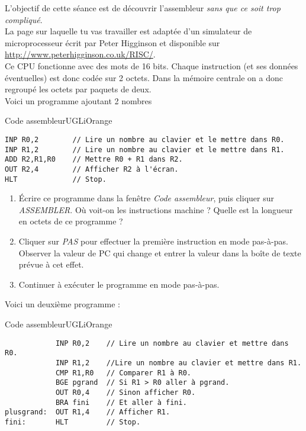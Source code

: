 \documentclass[a4paper,10pt,french]{article}
\begin{document}

L'objectif de cette séance est de découvrir l'assembleur \textit{sans que ce soit trop compliqué}.\\

La page sur laquelle tu vas travailler est adaptée d'un simulateur de microprocesseur écrit par Peter Higginson et disponible sur \url{http://www.peterhigginson.co.uk/RISC/}.\\
Ce CPU fonctionne avec des mots de 16 bits. Chaque instruction (et ses données éventuelles) est donc codée sur 2 octets. Dans la mémoire centrale on a donc regroupé les octets par paquets de deux.\\

Voici un programme ajoutant 2 nombres
\begin{encadrecolore}{Code assembleur}{UGLiOrange}
\begin{verbatim}
INP R0,2        // Lire un nombre au clavier et le mettre dans R0.
INP R1,2        // Lire un nombre au clavier et le mettre dans R1.
ADD R2,R1,R0    // Mettre R0 + R1 dans R2.
OUT R2,4        // Afficher R2 à l'écran.
HLT             // Stop.
\end{verbatim}
\end{encadrecolore}


\begin{exercice}[]
	\begin{enumerate}[\bfseries 1.]
		\item 		\'Ecrire ce programme dans la fenêtre \textit{Code assembleur}, puis cliquer sur \textit{ASSEMBLER}. Où voit-on les instructions machine ? Quelle est la longueur en octets de ce programme ?
		\item 	Cliquer sur \textit{PAS} pour effectuer la première instruction en mode pas-à-pas. Observer la valeur de PC qui change et entrer la valeur dans la boîte de texte prévue à cet effet.
		\item 	Continuer à exécuter le programme en mode pas-à-pas.
	\end{enumerate}
\end{exercice}

Voici un deuxième programme :

\begin{encadrecolore}{Code assembleur}{UGLiOrange}
\begin{verbatim}
            INP R0,2    // Lire un nombre au clavier et mettre dans R0.
            INP R1,2    //Lire un nombre au clavier et mettre dans R1.
            CMP R1,R0   // Comparer R1 à R0.
            BGE pgrand  // Si R1 > R0 aller à pgrand.
            OUT R0,4    // Sinon afficher R0.
            BRA fini    // Et aller à fini.
plusgrand:  OUT R1,4    // Afficher R1.
fini:       HLT         // Stop.
\end{verbatim}
\end{encadrecolore}
\end{document}
